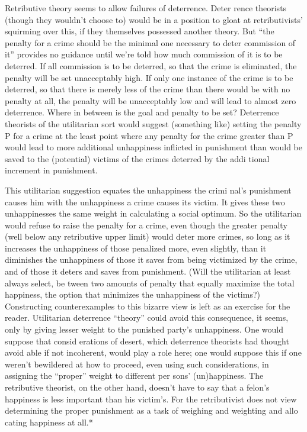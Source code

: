 \documentclass[11pt,openany]{book}
\begin{document}
Retributive theory seems to allow failures of deterrence. Deter rence theorists (though they wouldn't choose to) would be in a position to gloat at retributivists' squirming over this, if they themselves possessed another theory. But ``the penalty for a crime should be the minimal one necessary to deter commission of it'' provides no guidance until we're told how much commission of it is to be deterred. If all commission is to be deterred, so that the crime is eliminated, the penalty will be set unacceptably high. If only one instance of the crime is to be deterred, so that there is merely less of the crime than there would be with no penalty at all, the penalty will be unacceptably low and will lead to almost zero deterrence. Where in between is the goal and penalty to be set? Deterrence theorists of the utilitarian sort would suggest (something like) setting the penalty P for a crime at the least point where any penalty for the crime greater than P would lead to more additional unhappiness inflicted in punishment than would be saved to the (potential) victims of the crimes deterred by the addi tional increment in punishment. 

This utilitarian suggestion equates the unhappiness the crimi nal's punishment causes him with the unhappiness a crime causes its victim. It gives these two unhappinesses the same weight in calculating a social optimum. So the utilitarian would refuse to raise the penalty for a crime, even though the greater penalty (well below any retributive upper limit) would deter more crimes, so long as it increases the unhappiness of those penalized more, even slightly, than it diminishes the unhappiness of those it saves from being victimized by the crime, and of those it deters and saves from punishment. (Will the utilitarian at least always select, be tween two amounts of penalty that equally maximize the total happiness, the option that minimizes the unhappiness of the victims?) Constructing counterexamples to this bizarre view is left as an exercise for the reader. Utilitarian deterrence ``theory'' could avoid this consequence, it seems, only by giving lesser weight to the punished party's unhappiness. One would suppose that consid erations of desert, which deterrence theorists had thought avoid able if not incoherent, would play a role here; one would suppose this if one weren't bewildered at how to proceed, even using such considerations, in assigning the ``proper'' weight to different per sons' (un)happiness. The retributive theorist, on the other hand, doesn't have to say that a felon's happiness is less important than his victim's. For the retributivist does not view determining the proper punishment as a task of weighing and weighting and allo cating happiness at all.* 
\end{document}
